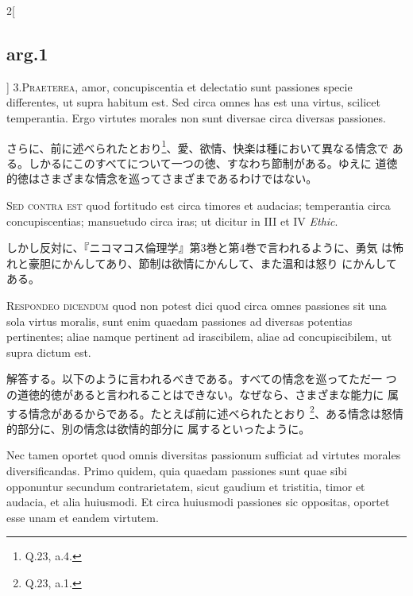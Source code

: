 \documentclass[paper=a4paper,fontsize=10pt,jafontsize=9pt,titlepage]{jlreq}
\begin{document}
\begin{paracol}{2}[\subsection{arg.1}]
3.{\scshape Praeterea}, amor, concupiscentia et delectatio sunt
passiones specie differentes, ut supra habitum est. Sed circa omnes
has est una virtus, scilicet temperantia. Ergo virtutes morales non
sunt diversae circa diversas passiones.

\switchcolumn

さらに、前に述べられたとおり\footnote{Q.23, a.4.}、愛、欲情、快楽は種において異なる情念で
 ある。しかるにこのすべてについて一つの徳、すなわち節制がある。ゆえに
 道徳的徳はさまざまな情念を巡ってさまざまであるわけではない。

\switchcolumn*[\subsection{s.c.}]

{\scshape Sed contra est} quod fortitudo est circa timores et
audacias; temperantia circa concupiscentias; mansuetudo circa iras; ut
dicitur in III et IV {\itshape Ethic}.

\switchcolumn

しかし反対に、『ニコマコス倫理学』第3巻と第4巻で言われるように、勇気
 は怖れと豪胆にかんしてあり、節制は欲情にかんして、また温和は怒り
 にかんしてある。


{\scshape Respondeo dicendum} quod non potest dici quod circa omnes
 passiones sit una sola virtus moralis, sunt enim quaedam passiones ad
 diversas potentias pertinentes; aliae namque pertinent ad
 irascibilem, aliae ad concupiscibilem, ut supra dictum est.

\switchcolumn

解答する。以下のように言われるべきである。すべての情念を巡ってただ一
つの道徳的徳があると言われることはできない。なぜなら、さまざまな能力に
属する情念があるからである。たとえば前に述べられたとおり
\footnote{Q.23, a.1.}、ある情念は怒情的部分に、別の情念は欲情的部分に
属するといったように。

\switchcolumn*

Nec tamen oportet quod omnis diversitas passionum sufficiat ad
virtutes morales diversificandas.  Primo quidem, quia quaedam
passiones sunt quae sibi opponuntur secundum contrarietatem, sicut
gaudium et tristitia, timor et audacia, et alia huiusmodi. Et circa
huiusmodi passiones sic oppositas, oportet esse unam et eandem
virtutem.


\end{paracol}
\end{document}
